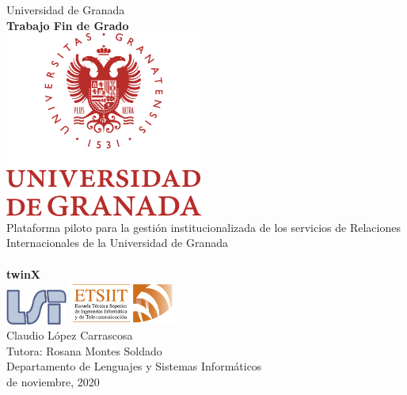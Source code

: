 \documentclass[12pt]{article}
\begin{document}


\begin{center}
\thispagestyle{empty}
{\LARGE Universidad de Granada}\\[.5cm]
{\Large \textbf{Trabajo Fin de Grado}}\\[1cm]
\includegraphics[width=6.5cm]{img/UGR.png}\\[1cm]
{\Large Plataforma piloto para la gestión institucionalizada de los servicios de
	Relaciones Internacionales de la Universidad de Granada\\~\\}
{\huge \bfseries twinX}\\[1.5cm]
\linespread{1}
\vspace{\fill}
\includegraphics[width=2cm]{img/LSI.png}\hspace{1cm}
\includegraphics[width=3.5cm]{img/ETSIIT.png}\\[1cm]
{\Large Claudio López Carrascosa}\\[0.5cm]
{\Large Tutora: Rosana Montes Soldado}\\[0.5cm]
{\Large Departamento de Lenguajes y Sistemas Informáticos}\\[0.5cm]
{\Large de noviembre, 2020}
\end{center}

\clearpage
{}

\newpage
\end{document}
